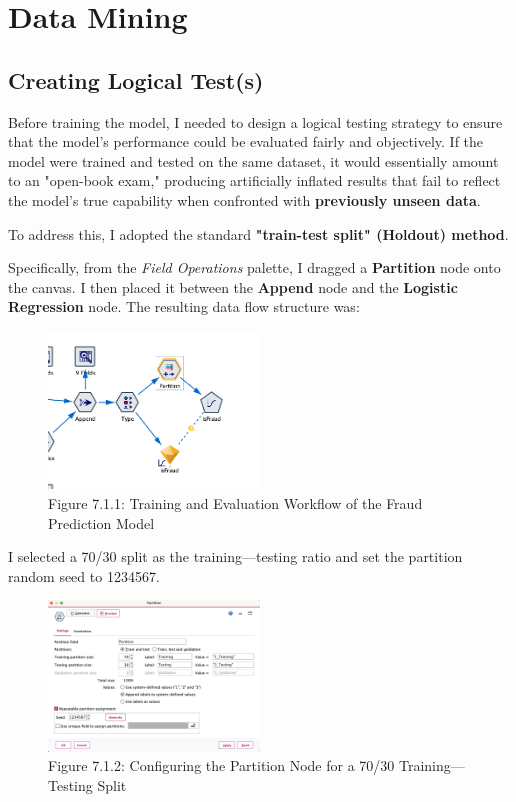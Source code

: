 \documentclass[sigplan,screen]{acmart}
\begin{document}
\section{Data Mining}

\subsection{Creating Logical Test(s)}

Before training the model, I needed to design a logical testing strategy to ensure that the model's performance could be evaluated fairly and objectively. If the model were trained and tested on the same dataset, it would essentially amount to an "open-book exam," producing artificially inflated results that fail to reflect the model's true capability when confronted with \textbf{previously unseen data}.

To address this, I adopted the standard \textbf{"train-test split" (Holdout) method}.

Specifically, from the \textit{Field Operations} palette, I dragged a \textbf{Partition} node onto the canvas. I then placed it between the \textbf{Append} node and the \textbf{Logistic Regression} node. The resulting data flow structure was:

\begin{figure}[H]
    \centering
    \includegraphics[width=0.5\textwidth]{7.1.1.png}
    \caption*{Figure 7.1.1: Training and Evaluation Workflow of the Fraud Prediction Model}
    \label{fig:7.1.1}
\end{figure}
I selected a 70/30 split as the training---testing ratio and set the partition random seed to 1234567.

\begin{figure}[H]
    \centering
    \includegraphics[width=0.5\textwidth]{7.1.2.png}
    \caption*{Figure 7.1.2: Configuring the Partition Node for a 70/30 Training---Testing Split}
    \label{fig:7.1.2}
\end{figure}
\end{document}

